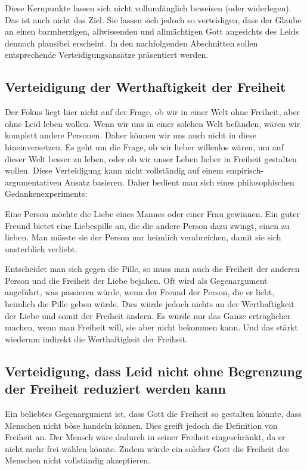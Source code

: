 Diese Kernpunkte lassen sich nicht vollumfänglich beweisen (oder widerlegen). Das ist auch nicht das Ziel. Sie lassen sich jedoch so verteidigen, dass der Glaube an einen barmherzigen, allwissenden und allmächtigen Gott angesichts des Leids dennoch plausibel erscheint. In den nachfolgenden Abschnitten sollen entsprechende Verteidigungsansätze präsentiert werden.


\subsection{Verteidigung der Werthaftigkeit der Freiheit} \label{Werthaftigkeit_Freiheit}
Der Fokus liegt hier nicht auf der Frage, ob wir in einer Welt ohne Freiheit, aber ohne Leid leben wollen. Wenn wir uns in einer solchen Welt befänden, wären wir komplett andere Personen. Daher können wir uns auch nicht in diese hineinversetzen. Es geht um die Frage, ob wir lieber willenlos wären, um auf dieser Welt besser zu leben, oder ob wir unser Leben lieber in Freiheit gestalten wollen. Diese Verteidigung kann nicht vollständig auf einem empirisch-argumentativen Ansatz basieren. Daher bedient man sich eines philosophischen Gedankenexperiments:

\begin{displayquote}
Eine Person möchte die Liebe eines Mannes oder einer Frau gewinnen. Ein guter Freund bietet eine Liebespille an, die die andere Person dazu zwingt, einen zu lieben. Man müsste sie der Person nur heimlich verabreichen, damit sie sich unsterblich verliebt.
\end{displayquote}

Entscheidet man sich gegen die Pille, so muss man auch die Freiheit der anderen Person und die Freiheit der Liebe bejahen. Oft wird als Gegenargument angeführt, was passieren würde, wenn der Freund der Person, die er liebt, heimlich die Pille geben würde. Dies würde jedoch nichts an der Werthaftigkeit der Liebe und somit der Freiheit ändern. Es würde nur das Ganze erträglicher machen, wenn man Freiheit will, sie aber nicht bekommen kann. Und das stärkt wiederum indirekt die Werthaftigkeit der Freiheit.

\subsection{Verteidigung, dass Leid nicht ohne Begrenzung der Freiheit reduziert werden kann} \label{Begrenzung_Freiheit}
Ein beliebtes Gegenargument ist, dass Gott die Freiheit so gestalten könnte, dass Menschen nicht böse handeln können. Dies greift jedoch die Definition von Freiheit an. Der Mensch wäre dadurch in seiner Freiheit eingeschränkt, da er nicht mehr frei wählen könnte. Zudem würde ein solcher Gott die Freiheit des Menschen nicht vollständig akzeptieren.\\

